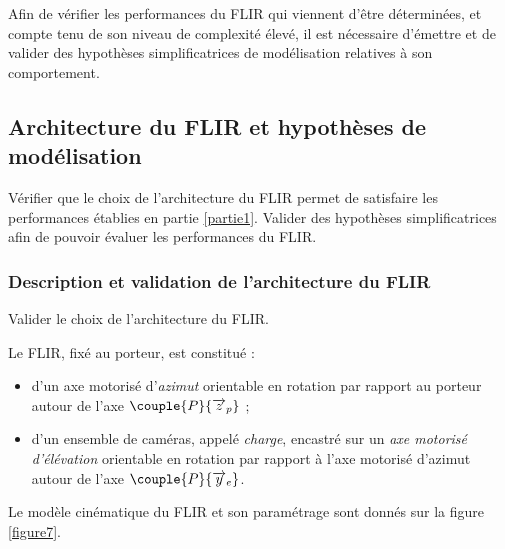 


Afin de vérifier les performances du FLIR qui viennent d'être déterminées, et compte tenu de son niveau de
complexité élevé, il est nécessaire d'émettre et de valider des hypothèses simplificatrices de modélisation relatives
à son comportement.

\subsection{Architecture du FLIR et hypothèses de modélisation}\label{partie2}

\begin{objectif}
Vérifier que le choix de l'architecture du FLIR permet de satisfaire les performances établies en partie \ref{partie1}.
Valider des hypothèses simplificatrices afin de pouvoir évaluer les performances du FLIR.
\end{objectif}

\subsubsection{Description et validation de l'architecture du FLIR}

\begin{objectif}
Valider le choix de l'architecture du FLIR.
\end{objectif}

Le FLIR, fixé au porteur, est constitué :
\begin{itemize}
\item d'un axe motorisé d'\textit{azimut} orientable en rotation par rapport au porteur autour de l'axe $\couple{P}{\overrightarrow{z}_p}$ ;
\item d'un ensemble de caméras, appelé \textit{charge}, encastré sur un \textit{axe motorisé d'élévation} orientable en rotation
par rapport à l'axe motorisé d'azimut autour de l'axe $\couple{P}{\overrightarrow{y}_e}$.
\end{itemize}

Le modèle cinématique du FLIR et son paramétrage sont donnés sur la figure \ref{figure7}.


